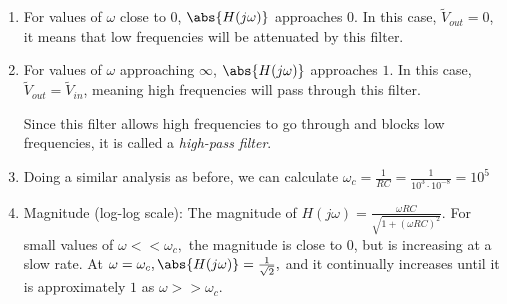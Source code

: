 \begin{enumerate}
{\begin{enumerate}[label=(\roman*)]
    Thus, the circuit has the transfer function

    \[
      H(j \omega) = \frac{Z_R}{Z_R + Z_C}
      = \frac{R}{R + \frac{1}{j\omega C}}
      = \frac{j\omega RC}{1 + j\omega RC}
    .\]

  \item For values of $\omega$ close to $0$, $\abs{H(j \omega)}$ approaches $0$.
    In this case, $\widetilde{V}_{out} = 0$, it means that low frequencies will be attenuated by this filter.

  \item For values of $\omega$ approaching $\infty$, $\abs{H(j \omega)}$ approaches $1$.
    In this case, $\widetilde{V}_{out} = \widetilde{V}_{in}$, meaning high frequencies will pass through this filter.

    \vspace{0.1 cm} 

    Since this filter allows high frequencies to go through and blocks low frequencies, it is called a \emph{high-pass filter}.

  \item Doing a similar analysis as before, we can calculate $\omega_{c} = \frac{1}{RC} = \frac{1}{10^{3} \cdot 10^{-8}} = 10^{5}$

  \item 
  Magnitude (log-log scale): The magnitude of $H(j \omega) = \frac{\omega RC}{\sqrt{1 + (\omega RC)^2}}.$ For small values of $\omega << \omega_{c},$ the magnitude is close to 0, but is increasing at a slow rate. At $\omega = \omega_{c}, \abs{H(j \omega)} = \frac{1}{\sqrt{2}},$ and it continually increases until it is approximately $1$ as $\omega >> \omega_{c}.$

  

\end{enumerate}}
\end{enumerate}
